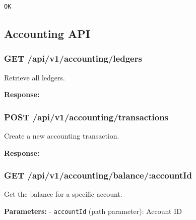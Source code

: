 \begin{verbatim}
OK
\end{verbatim}

\subsection{Accounting API}\label{accounting-api}

\subsubsection{GET
/api/v1/accounting/ledgers}\label{get-apiv1accountingledgers}

Retrieve all ledgers.

\textbf{Response:}

\begin{Shaded}
\begin{Highlighting}[]
\FunctionTok{\{}
  \FunctionTok{:} \FunctionTok{,}
  \FunctionTok{:} \OtherTok{[]}
\FunctionTok{\}}
\end{Highlighting}
\end{Shaded}

\subsubsection{POST
/api/v1/accounting/transactions}\label{post-apiv1accountingtransactions}

Create a new accounting transaction.

\textbf{Response:}

\begin{Shaded}
\begin{Highlighting}[]
\FunctionTok{\{}
  \FunctionTok{:} \FunctionTok{,}
  \FunctionTok{:} 
\FunctionTok{\}}
\end{Highlighting}
\end{Shaded}

\subsubsection{GET
/api/v1/accounting/balance/:accountId}\label{get-apiv1accountingbalanceaccountid}

Get the balance for a specific account.

\textbf{Parameters:} - \texttt{accountId} (path parameter): Account ID

